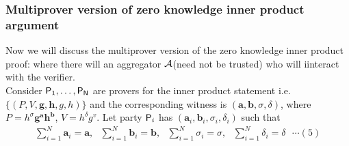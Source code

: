 \subsubsection{Multiprover version of zero knowledge inner product argument}
Now we will discuss the multiprover version of the zero knowledge inner product proof: where there will an aggregator $\mathcal{A}$(need not be trusted) who will iinteract with the verifier.\\
Consider $\mathsf{P}_1,\ldots, \mathsf{P}_{\mathsf{N}}$ are provers for the inner product statement i.e. $\{(P,V,\bm{g},\bm{h},g,h)\}$ and the corresponding witness is $(\bm{a},\bm{b}, \sigma, \delta)$, where $P= h^{\sigma} \bm{g}^{\bm{a}} \bm{h}^{\bm{b}}$, $V=h^{\delta}g^{v}$. Let party $\mathsf{P}_i$ has $(\bm{a}_i,\bm{b}_i,\sigma_i,\delta_i)$ such that
\begin{align*}
	\sum\limits_{i=1}^{N}\bm{a}_i=\bm{a},\text{ }
	\sum\limits_{i=1}^{N}\bm{b}_i=\bm{b},\text{ }
	\sum\limits_{i=1}^{N}\sigma_i=\sigma,\text{ }
	\sum\limits_{i=1}^{N}\delta_i=\delta \text{ }\cdots(5)
\end{align*}
